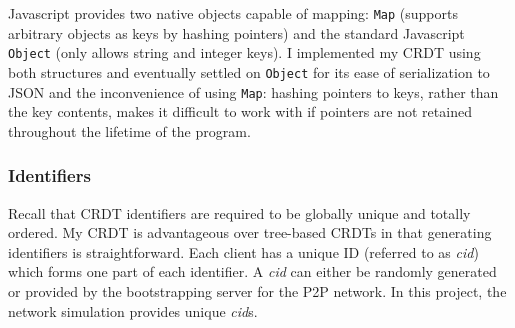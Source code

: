 \documentclass[12pt,a4paper,twoside,openright]{report}
\begin{document}
		Javascript provides two native objects capable of mapping: \texttt{Map} (supports arbitrary objects as keys by hashing pointers) and the standard Javascript \texttt{Object} (only allows string and integer keys). I implemented my CRDT using both structures and eventually settled on \texttt{Object} for its ease of serialization to JSON and the inconvenience of using \texttt{Map}: hashing pointers to keys, rather than the key contents, makes it difficult to work with if pointers are not retained throughout the lifetime of the program.
		
		
	
		\subsubsection{Identifiers} 	\label{sec:crdt:identifiers}
				
		Recall that CRDT identifiers are required to be globally unique and totally ordered. My CRDT is advantageous over tree-based CRDTs in that generating identifiers is straightforward. Each client has a unique ID (referred to as \textit{cid}) which forms one part of each identifier. A \textit{cid} can either be randomly generated or provided by the bootstrapping server for the P2P network. In this project, the network simulation provides unique \textit{cid}s.
		
\end{document}
